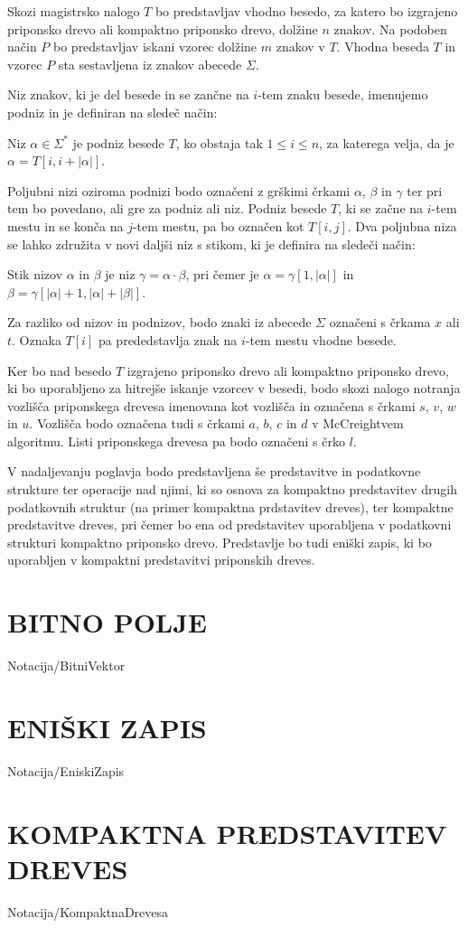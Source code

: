 Skozi magistrsko nalogo $T$ bo predstavljav vhodno besedo, za katero bo izgrajeno priponsko drevo ali kompaktno priponsko drevo, dolžine $n$ znakov. Na podoben način $P$ bo predstavljav iskani vzorec dolžine $m$ znakov v $T$. Vhodna beseda $T$ in vzorec $P$ sta sestavljena iz znakov abecede $\Sigma$.

Niz znakov, ki je del besede in se zančne na $i$-tem znaku besede, imenujemo podniz in je definiran na sledeč način:
\begin{defi}
    Niz $\alpha\in\Sigma^*$ je podniz besede $T$, ko obstaja tak $1\le i\le n$, za katerega velja, da je  $\alpha=T[i,i+|\alpha|]$. 
\end{defi}
Poljubni nizi oziroma podnizi bodo označeni z grškimi črkami $\alpha$, $\beta$ in $\gamma$ ter pri tem bo povedano, ali gre za podniz ali niz. Podniz besede $T$, ki se začne na $i$-tem mestu in se konča na $j$-tem mestu, pa bo označen kot $T[i,j]$. Dva poljubna niza se lahko združita v novi daljši niz s stikom, ki je definira na sledeči način:
\begin{defi}
    Stik nizov $\alpha$ in $\beta$ je niz $\gamma=\alpha\cdot\beta$, pri čemer je $\alpha=\gamma[1,|\alpha|]$ in $\beta=\gamma[|\alpha|+1,|\alpha|+|\beta|]$.
\end{defi}

Za razliko od nizov in podnizov, bodo znaki iz abecede $\Sigma$ označeni s črkama $x$ ali $t$. Oznaka $T[i]$ pa prededstavlja znak na $i$-tem mestu vhodne besede.

Ker bo nad besedo $T$ izgrajeno priponsko drevo ali kompaktno priponsko drevo, ki bo uporabljeno za hitrejše iskanje vzorcev v besedi, bodo skozi nalogo notranja vozlišča priponskega drevesa imenovana kot vozlišča in označena s črkami $s$, $v$, $w$ in $u$. Vozlišča bodo označena tudi s črkami $a$, $b$, $c$ in $d$ v McCreightvem algoritmu. Listi priponskega drevesa pa bodo označeni s črko $l$.

V nadaljevanju poglavja bodo predstavljena še predstavitve in podatkovne strukture ter operacije nad njimi, ki so osnova za kompaktno predstavitev drugih podatkovnih struktur (na primer kompaktna prdstavitev dreves), ter kompaktne predstavitve dreves, pri čemer bo ena od predstavitev uporabljena v podatkovni strukturi kompaktno priponsko drevo. Predstavlje bo tudi eniški zapis, ki bo uporabljen v kompaktni predstavitvi priponskih dreves.

\section{BITNO POLJE}\label{sec:Bitno_Polje}
{Notacija/BitniVektor}

\section{ENIŠKI ZAPIS}\label{sec:Eniski_Zapis}
{Notacija/EniskiZapis}

\section{KOMPAKTNA PREDSTAVITEV DREVES}\label{sec:kompaktna_drevesa}
{Notacija/KompaktnaDrevesa}